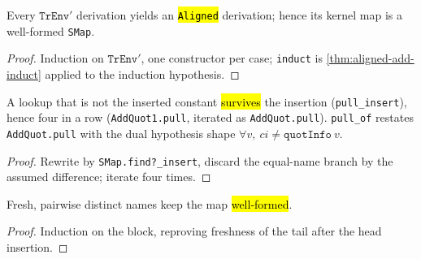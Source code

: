 \begin{theorem}
\label{thm:tr-env-aligned}
\leanok
{}

 Every $\mathtt{TrEnv}'$ derivation yields an \hl{\texttt{Aligned}}
derivation; hence its kernel map is a well-formed \texttt{SMap}.
\end{theorem}
\begin{proof}
\leanok
{} Induction on $\mathtt{TrEnv}'$, one constructor per case; \texttt{induct} is
\ref{thm:aligned-add-induct} applied to the induction hypothesis.
\end{proof}

\begin{lemma}
\label{family:quot-pullbacks}
\leanok
{}

 A lookup that is not the inserted constant \hl{survives} the insertion
(\texttt{pull\_insert}), hence four in a row (\texttt{AddQuot1.pull}, iterated as
\texttt{AddQuot.pull}). \texttt{pull\_of} restates \texttt{AddQuot.pull} with the dual
hypothesis shape $\forall v,\ ci \ne \mathtt{quotInfo}\ v$.
\end{lemma}
\begin{proof}
\leanok
{} Rewrite by \texttt{SMap.find?\_insert}, discard the equal-name branch by the
assumed difference; iterate four times.
\end{proof}

\begin{lemma}
\label{thm:insert-defs-wf}
\leanok
{}

 Fresh, pairwise distinct names keep the map \hl{well-formed}.
\end{lemma}
\begin{proof}
\leanok
{} Induction on the block, reproving freshness of the tail after the head
insertion.
\end{proof}

